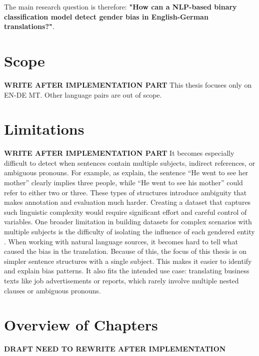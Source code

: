 The main research question is therefore: \textbf{"How can a NLP-based binary classification model detect gender bias in English-German translations?"}. 

\section{Scope}

\textbf{WRITE AFTER IMPLEMENTATION PART}
This thesis focuses only on EN-DE MT. Other language pairs are out of scope.

\section{Limitations}
\textbf{WRITE AFTER IMPLEMENTATION PART}
It becomes especially difficult to detect when sentences contain multiple subjects, indirect references, or ambiguous pronouns. For example, as \citet{barclayInvestigatingMarkersDrivers2024a} explain, the sentence “He went to see her mother” clearly implies three people, while “He went to see his mother” could refer to either two or three. These types of structures introduce ambiguity that makes annotation and evaluation much harder. Creating a dataset that captures such linguistic complexity would require significant effort and careful control of variables. One broader limitation in building datasets for complex scenarios with multiple subjects is the difficulty of isolating the influence of each gendered entity \citep{lardelliBuildingBridgesDataset2024}. When working with natural language sources, it becomes hard to tell what caused the bias in the translation. Because of this, the focus of this thesis is on simpler sentence structures with a single subject. This makes it easier to identify and explain bias patterns. It also fits the intended use case: translating business texts like job advertisements or reports, which rarely involve multiple nested clauses or ambiguous pronouns.
 

\section{Overview of Chapters}
\textbf{DRAFT NEED TO REWRITE AFTER IMPLEMENTATION}
